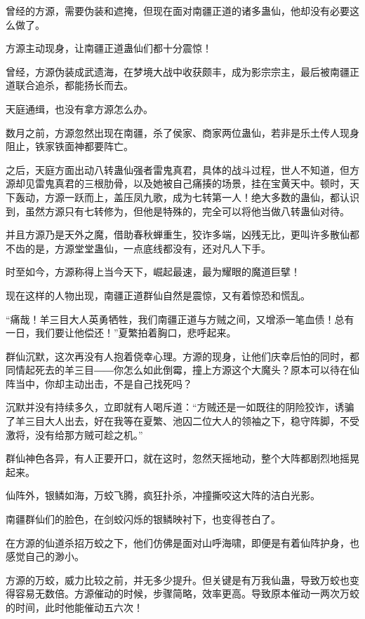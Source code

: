 
\begin{this_body}

曾经的方源，需要伪装和遮掩，但现在面对南疆正道的诸多蛊仙，他却没有必要这么做了。

方源主动现身，让南疆正道蛊仙们都十分震惊！

曾经，方源伪装成武遗海，在梦境大战中收获颇丰，成为影宗宗主，最后被南疆正道联合追杀，都能扬长而去。

天庭通缉，也没有拿方源怎么办。

数月之前，方源忽然出现在南疆，杀了侯家、商家两位蛊仙，若非是乐土传人现身阻止，铁家铁面神都要阵亡。

之后，天庭方面出动八转蛊仙强者雷鬼真君，具体的战斗过程，世人不知道，但方源却见雷鬼真君的三根肋骨，以及她被自己痛揍的场景，挂在宝黄天中。顿时，天下轰动，方源一跃而上，盖压凤九歌，成为七转第一人！绝大多数的蛊仙，都认识到，虽然方源只有七转修为，但他是特殊的，完全可以将他当做八转蛊仙对待。

并且方源乃是天外之魔，借助春秋蝉重生，狡诈多端，凶残无比，更叫许多散仙都不齿的是，方源堂堂蛊仙，一点底线都没有，还对凡人下手。

时至如今，方源称得上当今天下，崛起最速，最为耀眼的魔道巨擘！

现在这样的人物出现，南疆正道群仙自然是震惊，又有着惊恐和慌乱。

“痛哉！羊三目大人英勇牺牲，我们南疆正道与方贼之间，又增添一笔血债！总有一日，我们要让他偿还！”夏繁拍着胸口，悲呼起来。

群仙沉默，这次再没有人抱着侥幸心理。方源的现身，让他们庆幸后怕的同时，都同情起死去的羊三目――你怎么如此倒霉，撞上方源这个大魔头？原本可以待在仙阵当中，你却主动出击，不是自己找死吗？

沉默并没有持续多久，立即就有人喝斥道：“方贼还是一如既往的阴险狡诈，诱骗了羊三目大人出去，好在我等在夏繁、池囚二位大人的领袖之下，稳守阵脚，不受激将，没有给那方贼可趁之机。”

群仙神色各异，有人正要开口，就在这时，忽然天摇地动，整个大阵都剧烈地摇晃起来。

仙阵外，银鳞如海，万蛟飞腾，疯狂扑杀，冲撞撕咬这大阵的洁白光影。

南疆群仙们的脸色，在剑蛟闪烁的银鳞映衬下，也变得苍白了。

在方源的仙道杀招万蛟之下，他们仿佛是面对山呼海啸，即便是有着仙阵护身，也感觉自己的渺小。

方源的万蛟，威力比较之前，并无多少提升。但关键是有万我仙蛊，导致万蛟也变得容易无数倍。方源催动的时候，步骤简略，效率更高。导致原本催动一两次万蛟的时间，此时他能催动五六次！


\end{this_body}
